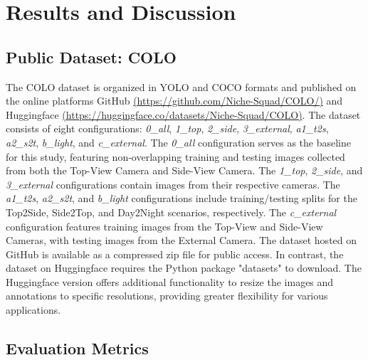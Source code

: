 \section{Results and Discussion}

\subsection*{Public Dataset: COLO}

The COLO dataset is organized in YOLO and COCO formats and published on the online platforms GitHub \href{https://github.com/Niche-Squad/COLO/}{(https://github.com/Niche-Squad/COLO/)} and Huggingface \href{https://huggingface.co/datasets/Niche-Squad/COLO}{(https://huggingface.co/datasets/Niche-Squad/COLO)}. The dataset consists of eight configurations:
\textit{0\_all}, \textit{1\_top}, \textit{2\_side}, \textit{3\_external}, \textit{a1\_t2s}, \textit{a2\_s2t}, \textit{b\_light}, and \textit{c\_external}. The \textit{0\_all} configuration serves as the baseline for this study, featuring non-overlapping training and testing images collected from both the Top-View Camera and Side-View Camera. The \textit{1\_top}, \textit{2\_side}, and \textit{3\_external} configurations contain images from their respective cameras. The \textit{a1\_t2s}, \textit{a2\_s2t}, and \textit{b\_light} configurations include training/testing splits for the Top2Side, Side2Top, and Day2Night scenarios, respectively. The \textit{c\_external} configuration features training images from the Top-View and Side-View Cameras, with testing images from the External Camera. The dataset hosted on GitHub is available as a compressed zip file for public access. In contrast, the dataset on Huggingface requires the Python package "datasets" \cite{datasets} to download. The Huggingface version offers additional functionality to resize the images and annotations to specific resolutions, providing greater flexibility for various applications.

\subsection*{Evaluation Metrics}

